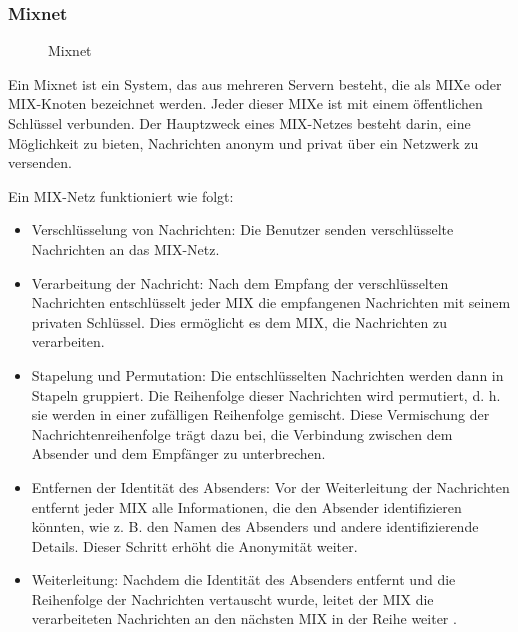 \subsubsection{Mixnet}

\begin{figure}[h!]
    \centering
    
    \caption{Mixnet}
    \label{imgs:mixnet}
\end{figure}

Ein Mixnet ist ein System, das aus mehreren Servern besteht, die als MIXe oder MIX-Knoten bezeichnet werden. Jeder dieser MIXe ist mit einem öffentlichen Schlüssel verbunden. Der Hauptzweck eines MIX-Netzes besteht darin, eine Möglichkeit zu bieten, Nachrichten anonym und privat über ein Netzwerk zu versenden.

Ein MIX-Netz funktioniert wie folgt:

\begin{itemize}

\item Verschlüsselung von Nachrichten: Die Benutzer senden verschlüsselte Nachrichten an das MIX-Netz.

\item Verarbeitung der Nachricht: Nach dem Empfang der verschlüsselten Nachrichten entschlüsselt jeder MIX die empfangenen Nachrichten mit seinem privaten Schlüssel. Dies ermöglicht es dem MIX, die Nachrichten zu verarbeiten.

\item Stapelung und Permutation: Die entschlüsselten Nachrichten werden dann in Stapeln gruppiert. Die Reihenfolge dieser Nachrichten wird permutiert, d. h. sie werden in einer zufälligen Reihenfolge gemischt. Diese Vermischung der Nachrichtenreihenfolge trägt dazu bei, die Verbindung zwischen dem Absender und dem Empfänger zu unterbrechen.

\item Entfernen der Identität des Absenders: Vor der Weiterleitung der Nachrichten entfernt jeder MIX alle Informationen, die den Absender identifizieren könnten, wie z. B. den Namen des Absenders und andere identifizierende Details. Dieser Schritt erhöht die Anonymität weiter.

\item Weiterleitung: Nachdem die Identität des Absenders entfernt und die Reihenfolge der Nachrichten vertauscht wurde, leitet der MIX die verarbeiteten Nachrichten an den nächsten MIX in der Reihe weiter
\footnotemark{}.

\end{itemize}

